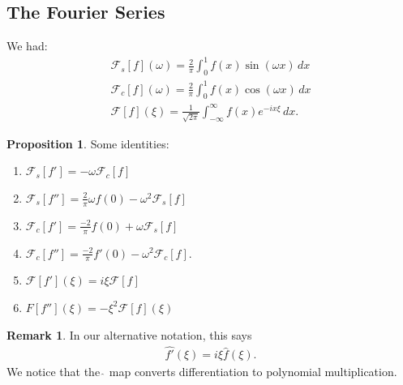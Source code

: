 \documentclass{article}
\theoremstyle{definition}
\newtheorem{prop}{Proposition}[section]
\newtheorem{rmk}{Remark}[section]
\newcommand{\F}{\mathcal{F}}
\begin{document}

\subsection{The Fourier Series}
We had:
\begin{align*}
\F_s[f](\omega) = \frac{2}{\pi}\int^1_0 f(x)\sin(\omega x)\,dx\\
\F_c[f](\omega) = \frac{2}{\pi}\int^1_0 f(x)\cos(\omega x)\,dx\\
\F[f](\xi) = \frac{1}{\sqrt{2\pi}}\int^\infty_{-\infty}f(x)e^{-ix\xi}\,dx.
\end{align*}

\begin{prop} Some identities:
	\begin{enumerate}
		\item $\F_s[f'] = -\omega \F_c[f]$\\
		\item $\F_s[f''] = \frac{2}{\pi}\omega f(0) - \omega^2 \F_s[f]$\\
		\item $\F_c[f'] = \frac{-2}{\pi}f(0) + \omega\F_s[f]$\\
		\item $\F_c[f''] = \frac{-2}{\pi}f'(0) - \omega^2 \F_c[f]$.\\
		\item $\F[f'](\xi) = i\xi \F[f] $\\
		\item $F[f''](\xi) = -\xi^2\F[f](\xi)$
	\end{enumerate}
\end{prop}


\begin{rmk}
	In our alternative notation, this says
	\begin{align*}
	\hat{f'}(\xi) = i\xi \hat{f}(\xi).
	\end{align*}
	We notice that the $\hat{\,}$ map converts differentiation to polynomial multiplication.\\
\end{rmk}
\end{document}
